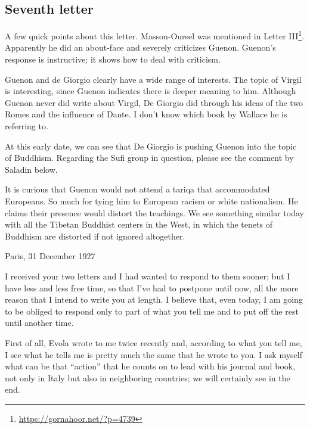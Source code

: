 \subsection{Seventh letter}

\begin{quotationx}
A few quick points about this letter. Masson-Oursel was mentioned in Letter III\footnote{\url{https://gornahoor.net/?p=4739}}. Apparently he did an about-face and severely criticizes Guenon. Guenon's response is instructive; it shows how to deal with criticism.

Guenon and de Giorgio clearly have a wide range of interests. The topic of Virgil is interesting, since Guenon indicates there is deeper meaning to him. Although Guenon never did write about Virgil, De Giorgio did through his ideas of the two Romes and the influence of Dante. I don't know which book by Wallace he is referring to.

At this early date, we can see that De Giorgio is pushing Guenon into the topic of Buddhism. Regarding the Sufi group in question, please see the comment by Saladin below.

It is curious that Guenon would not attend a tariqa that accommodated Europeans. So much for tying him to European racism or white nationalism. He claims their presence would distort the teachings. We see something similar today with all the Tibetan Buddhist centers in the West, in which the tenets of Buddhism are distorted if not ignored altogether.
\end{quotationx}


Paris, 31 December 1927

I received your two letters and I had wanted to respond to them sooner; but I have less and less free time, so that I've had to postpone until now, all the more reason that I intend to write you at length. I believe that, even today, I am going to be obliged to respond only to part of what you tell me and to put off the rest until another time.

First of all, Evola wrote to me twice recently and, according to what you tell me, I see what he tells me is pretty much the same that he wrote to you. I ask myself what can be that ``action'' that he counts on to lead with his journal and book, not only in Italy but also in neighboring countries; we will certainly see in the end.

